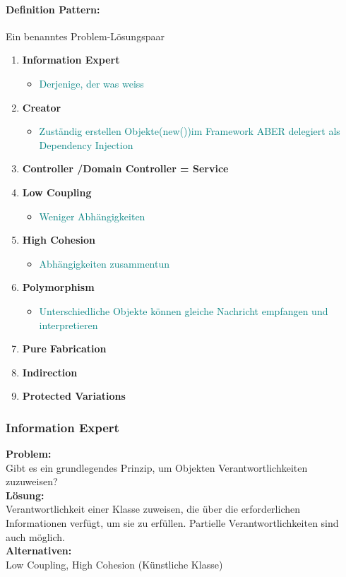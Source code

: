 \documentclass[../ZF_SWEN1.tex]{subfiles}
\begin{document}
\paragraph{Definition Pattern:} Ein benanntes Problem-Lösungspaar
\begin{enumerate}
	\item \textbf{Information Expert}
	\begin{itemize}
		\item \textcolor {teal} {Derjenige, der was weiss}
	\end{itemize}
	\item \textbf{Creator}
		\begin{itemize}
		\item \textcolor {teal} {Zuständig erstellen Objekte(new())im Framework ABER delegiert als Dependency Injection}
	\end{itemize}
	\item \textbf{Controller /Domain Controller = Service}
	\item \textbf{Low Coupling}
		\begin{itemize}
		\item \textcolor {teal} {Weniger Abhängigkeiten}
	\end{itemize}
	\item \textbf{High Cohesion}
		\begin{itemize}
		\item \textcolor {teal} {Abhängigkeiten zusammentun}
	\end{itemize}
	\item \textbf{Polymorphism}
		\begin{itemize}
		\item \textcolor {teal} {Unterschiedliche Objekte können gleiche Nachricht empfangen und interpretieren}
	\end{itemize}
	\item \textbf{Pure Fabrication}
	\item \textbf{Indirection}
	\item \textbf{Protected Variations}
\end{enumerate}

\subsubsection{Information Expert}
\textbf{Problem:\\}
Gibt es ein grundlegendes Prinzip, um Objekten Verantwortlichkeiten zuzuweisen?\\
\textbf{Lösung:\\}
Verantwortlichkeit einer Klasse zuweisen, die über die erforderlichen Informationen verfügt, um sie zu erfüllen. Partielle Verantwortlichkeiten sind auch möglich.\\
\textbf{Alternativen:\\}
Low Coupling, High Cohesion (Künstliche Klasse)
\end{document}
